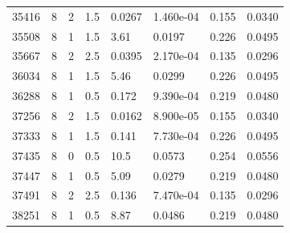 \documentclass[preview]{standalone}
\begin{document}
{{{\begin{tabular}{L{1.2cm}C{1.2cm} C{0.3cm}C{0.5cm} C{1.4cm}C{1.4cm} C{1.4cm}C{1.4cm}}
  35416  &     8  & 2     & 1.5 &  0.0267  & 1.460e-04  & 0.155 &  0.0340   \\ 
  35508  &     8  & 1     & 1.5 &  3.61  & 0.0197  & 0.226 &  0.0495   \\ 
  35667  &     8  & 2     & 2.5 &  0.0395  & 2.170e-04  & 0.135 &  0.0296   \\ 
  36034  &     8  & 1     & 1.5 &  5.46  & 0.0299  & 0.226 &  0.0495   \\ 
  36288  &     8  & 1     & 0.5 &  0.172  & 9.390e-04  & 0.219 &  0.0480   \\ 
  37256  &     8  & 2     & 1.5 &  0.0162  & 8.900e-05  & 0.155 &  0.0340   \\ 
  37333  &     8  & 1     & 1.5 &  0.141  & 7.730e-04  & 0.226 &  0.0495   \\ 
  37435  &     8  & 0     & 0.5 &  10.5  & 0.0573  & 0.254 &  0.0556   \\ 
  37447  &     8  & 1     & 0.5 &  5.09  & 0.0279  & 0.219 &  0.0480   \\ 
  37491  &     8  & 2     & 2.5 &  0.136  & 7.470e-04  & 0.135 &  0.0296   \\ 
  38251  &     8  & 1     & 0.5 &  8.87  & 0.0486  & 0.219 &  0.0480   \\ 
\hline 
\end{tabular} 

}}}
\end{document}
